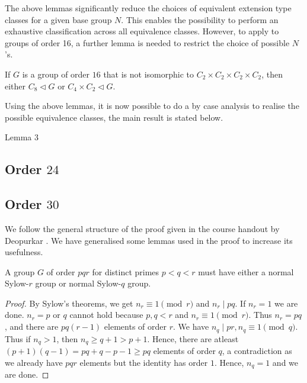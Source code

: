 \documentclass[a4paper,11pt, titlepage]{article}
\theoremstyle{remark}
\begin{document}
The above lemmas significantly reduce the choices of equivalent extension type classes for a given base group $N$. This enables the possibility to perform an exhaustive classification across all equivalence classes. However, to apply to groups of order 16, a further lemma is needed to restrict the choice of possible $N$'s.

\begin{lemma}[Wild]
    If $G$ is a group of order $16$ that is not isomorphic to $C_2 \times C_2 \times C_2 \times C_2$, then either $C_8 \lhd G$ or $C_4 \times C_2 \lhd G$.
\end{lemma}

Using the above lemmas, it is now possible to do a by case analysis to realise the possible equivalence classes, the main result is stated below.

\begin{lemma}[Wild]
    Lemma 3
\end{lemma}

\subsection{Order $24$}
\label{Order $24$}

\subsection{Order $30$}
\label{Order $30$}

We follow the general structure of the proof given in the course handout by Deopurkar \cite{deopurkar_modern_2013}. We have generalised some lemmas used in the proof to increase its usefulness.

\begin{theorem}\label{Groups of order $pqr$ have either a normal Sylow-$r$ group or normal Sylow-$q$ group}
    A group $G$ of order $pqr$ for distinct primes $p < q < r$ must have either a normal Sylow-$r$ group or normal Sylow-$q$ group.
\end{theorem}
\begin{proof}
    By Sylow's theorems, we get $n_r \equiv 1 \pmod r$ and $n_r \mid pq$. If $n_r = 1$  we are done. $n_r = p$ or $q$ cannot hold because $p, q < r$ and $n_r \equiv 1 \pmod r$. Thus $n_r = pq$, and there are $pq(r-1)$ elements of order $r$. We have $n_q \mid pr, n_q \equiv 1 \pmod q$. Thus if $n_q > 1$, then $n_q \geq q + 1 > p + 1$. Hence, there are atleast $(p+1)(q-1) = pq + q - p - 1 \geq pq$ elements of order $q$, a contradiction as we already have $pqr$ elements but the identity has order $1$. Hence, $n_q = 1$ and we are done.
\end{proof}
\end{document}
